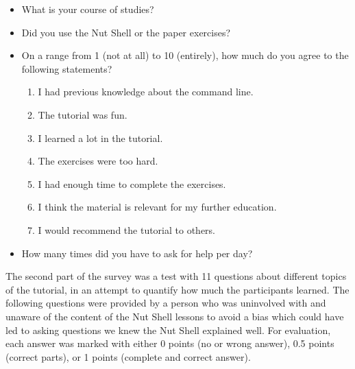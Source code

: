 \documentclass[paper=a4,twoside,abstract=on,cleardoublepage=empty,numbers=noenddot,toc=bib,12pt,appendixprefix=true]{scrreprt}
\begin{document}
\begin{itemize}
    \item What is your course of studies?
    \item Did you use the Nut Shell or the paper exercises?
    \item On a range from 1 (not at all) to 10 (entirely), how much do you agree to the following statements?
        \begin{enumerate}
            \item I had previous knowledge about the command line.
            \item The tutorial was fun.
            \item I learned a lot in the tutorial.
            \item The exercises were too hard.
            \item I had enough time to complete the exercises.
            \item I think the material is relevant for my further education.
            \item I would recommend the tutorial to others.
        \end{enumerate}
    \item How many times did you have to ask for help per day?
\end{itemize}

The second part of the survey was a test with 11 questions about different topics of the tutorial, in an attempt to quantify how much the participants learned. The following questions were provided by a person who was uninvolved with and unaware of the content of the Nut Shell lessons to avoid a bias which could have led to asking questions we knew the Nut Shell explained well. For evaluation, each answer was marked with either 0 points (no or wrong answer), 0.5 points (correct parts), or 1 points (complete and correct answer).
\end{document}
